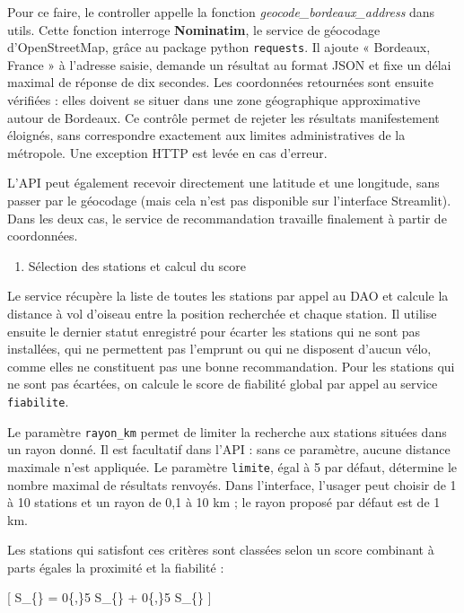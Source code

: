 \documentclass[
  french,
  11pt,
  a4paper,
]{article}
\providecommand{\tightlist}{%
  \setlength{\itemsep}{0pt}\setlength{\parskip}{0pt}}
\begin{document}
Pour ce faire, le controller appelle la fonction
\emph{geocode\_bordeaux\_address} dans utils. Cette fonction interroge
\textbf{Nominatim}, le service de géocodage d'OpenStreetMap, grâce au
package python \texttt{requests}. Il ajoute « Bordeaux, France » à
l'adresse saisie, demande un résultat au format JSON et fixe un délai
maximal de réponse de dix secondes. Les coordonnées retournées sont
ensuite vérifiées : elles doivent se situer dans une zone géographique
approximative autour de Bordeaux. Ce contrôle permet de rejeter les
résultats manifestement éloignés, sans correspondre exactement aux
limites administratives de la métropole. Une exception HTTP est levée en
cas d'erreur.

L'API peut également recevoir directement une latitude et une longitude,
sans passer par le géocodage (mais cela n'est pas disponible sur
l'interface Streamlit). Dans les deux cas, le service de recommandation
travaille finalement à partir de coordonnées.

\begin{enumerate}
\def\labelenumi{\arabic{enumi})}
\setcounter{enumi}{2}
\tightlist
\item
  Sélection des stations et calcul du score
\end{enumerate}

Le service récupère la liste de toutes les stations par appel au DAO et
calcule la distance à vol d'oiseau entre la position recherchée et
chaque station. Il utilise ensuite le dernier statut enregistré pour
écarter les stations qui ne sont pas installées, qui ne permettent pas
l'emprunt ou qui ne disposent d'aucun vélo, comme elles ne constituent
pas une bonne recommandation. Pour les stations qui ne sont pas
écartées, on calcule le score de fiabilité global par appel au service
\texttt{fiabilite}.

Le paramètre \texttt{rayon\_km} permet de limiter la recherche aux
stations situées dans un rayon donné. Il est facultatif dans l'API :
sans ce paramètre, aucune distance maximale n'est appliquée. Le
paramètre \texttt{limite}, égal à 5 par défaut, détermine le nombre
maximal de résultats renvoyés. Dans l'interface, l'usager peut choisir
de 1 à 10 stations et un rayon de 0,1 à 10 km ; le rayon proposé par
défaut est de 1 km.

Les stations qui satisfont ces critères sont classées selon un score
combinant à parts égales la proximité et la fiabilité :

{[} S\_\{\} = 0\{,\}5
\times S\_\{\} + 0\{,\}5
\times S\_\{\} {]}
\end{document}

